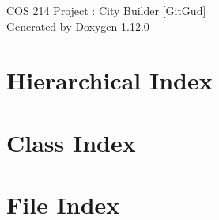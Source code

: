 \documentclass[twoside]{book}
\newcommand{\+}{\discretionary{\mbox{\scriptsize$\hookleftarrow$}}{}{}}
\newcommand{\clearemptydoublepage}{%
    \newpage{\pagestyle{empty}\cleardoublepage}%
  }
\begin{document}
  \raggedbottom
    \hypersetup{pageanchor=false,
                bookmarksnumbered=true,
                pdfencoding=unicode
               }
  \begin{titlepage}
  \vspace*{7cm}
  \begin{center}%
  {\Large COS 214 Project \+: City Builder \mbox{[}\+Git\+Gud\mbox{]}}\\
  \vspace*{1cm}
  {\large Generated by Doxygen 1.12.0}\\
  \end{center}
  \end{titlepage}
  \clearemptydoublepage
  \tableofcontents
  \clearemptydoublepage
  \hypersetup{pageanchor=true}

\chapter{Hierarchical Index}

\chapter{Class Index}

\chapter{File Index}

\end{document}
